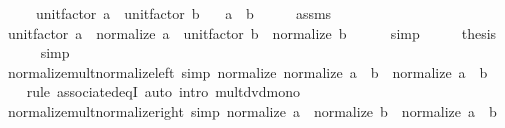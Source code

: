 \begin{isabellebody}
\ \ \ \ \ {\isachardoublequoteopen}unit{\isacharunderscore}{\kern0pt}factor\ a\ {\isacharequal}{\kern0pt}\ unit{\isacharunderscore}{\kern0pt}factor\ b{\isachardoublequoteclose}\isanewline
\ \ \ {\isachardoublequoteopen}a\ {\isacharequal}{\kern0pt}\ b{\isachardoublequoteclose}\isanewline
%
\isadelimproof
%
\endisadelimproof
%
\isatagproof
{}\isamarkupfalse%
\ {\isacharminus}{\kern0pt}\isanewline
\ \ \isamarkupfalse%
\ assms\ \isamarkupfalse%
\ {\isachardoublequoteopen}unit{\isacharunderscore}{\kern0pt}factor\ a\ {\isacharasterisk}{\kern0pt}\ normalize\ a\ {\isacharequal}{\kern0pt}\ unit{\isacharunderscore}{\kern0pt}factor\ b\ {\isacharasterisk}{\kern0pt}\ normalize\ b{\isachardoublequoteclose}\isanewline
\ \ \ \ \isamarkupfalse%
\ simp\isanewline
\ \ \isamarkupfalse%
\ \isamarkupfalse%
\ {\isacharquery}{\kern0pt}thesis\isanewline
\ \ \ \ \isamarkupfalse%
\ simp\isanewline
{}\isamarkupfalse%
%
\endisatagproof
{\isafoldproof}%
%
\isadelimproof
\isanewline
%
\endisadelimproof
\isanewline
{}\isamarkupfalse%
\ normalize{\isacharunderscore}{\kern0pt}mult{\isacharunderscore}{\kern0pt}normalize{\isacharunderscore}{\kern0pt}left\ {\isacharbrackleft}{\kern0pt}simp{\isacharbrackright}{\kern0pt}{\isacharcolon}{\kern0pt}\ {\isachardoublequoteopen}normalize\ {\isacharparenleft}{\kern0pt}normalize\ a\ {\isacharasterisk}{\kern0pt}\ b{\isacharparenright}{\kern0pt}\ {\isacharequal}{\kern0pt}\ normalize\ {\isacharparenleft}{\kern0pt}a\ {\isacharasterisk}{\kern0pt}\ b{\isacharparenright}{\kern0pt}{\isachardoublequoteclose}\isanewline
%
\isadelimproof
\ \ %
\endisadelimproof
%
\isatagproof
{}\isamarkupfalse%
\ {\isacharparenleft}{\kern0pt}rule\ associated{\isacharunderscore}{\kern0pt}eqI{\isacharparenright}{\kern0pt}\ {\isacharparenleft}{\kern0pt}auto\ intro{\isacharbang}{\kern0pt}{\isacharcolon}{\kern0pt}\ mult{\isacharunderscore}{\kern0pt}dvd{\isacharunderscore}{\kern0pt}mono{\isacharparenright}{\kern0pt}%
\endisatagproof
{\isafoldproof}%
%
\isadelimproof
\isanewline
%
\endisadelimproof
\isanewline
{}\isamarkupfalse%
\ normalize{\isacharunderscore}{\kern0pt}mult{\isacharunderscore}{\kern0pt}normalize{\isacharunderscore}{\kern0pt}right\ {\isacharbrackleft}{\kern0pt}simp{\isacharbrackright}{\kern0pt}{\isacharcolon}{\kern0pt}\ {\isachardoublequoteopen}normalize\ {\isacharparenleft}{\kern0pt}a\ {\isacharasterisk}{\kern0pt}\ normalize\ b{\isacharparenright}{\kern0pt}\ {\isacharequal}{\kern0pt}\ normalize\ {\isacharparenleft}{\kern0pt}a\ {\isacharasterisk}{\kern0pt}\ b{\isacharparenright}{\kern0pt}{\isachardoublequoteclose}\isanewline

\end{isabellebody}
